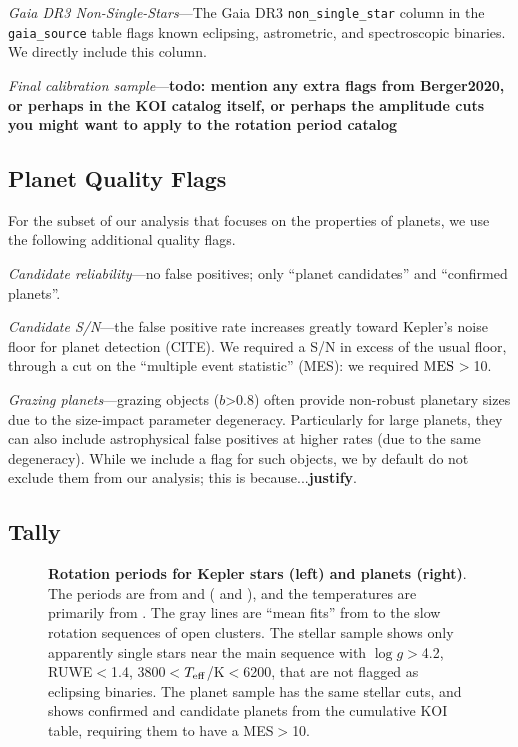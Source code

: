 \documentclass[11pt,twocolumn,tighten]{aastex63}
\begin{document}
{\it Gaia DR3 Non-Single-Stars}---The Gaia DR3
\texttt{non\_single\_star} column in the \texttt{gaia\_source} table
flags known eclipsing, astrometric, and spectroscopic binaries.  We
directly include this column.

{\it Final calibration sample}---{\bf todo: mention any extra flags
from Berger2020, or perhaps in the KOI catalog itself, or perhaps the
amplitude cuts you might want to apply to the rotation period catalog}


\subsection{Planet Quality Flags}
For the subset of our analysis that focuses on the properties of
planets, we use the following additional quality flags.

{\it Candidate reliability}---no false positives; only ``planet
candidates'' and ``confirmed planets''.

{\it Candidate S/N}---the false positive rate increases greatly toward
Kepler's noise floor for planet detection (CITE).  We required a S/N
in excess of the usual floor, through a cut on the ``multiple event
statistic'' (MES): we required ${\rm MES}$$>$10.

{\it Grazing planets}---grazing objects ($b$>0.8) often provide
non-robust planetary sizes due to the size-impact parameter
degeneracy.  Particularly for large planets, they can also include
astrophysical false positives at higher rates (due to the same
degeneracy).  While we include a flag for such objects, we by default
do not exclude them from our analysis; this is because...{\bf justify}.

\subsection{Tally}
\label{subsec:tally}

\begin{figure*}[!t]
	\begin{center}
	\end{center}
	\vspace{-0.5cm}
	\caption{
    {\bf Rotation periods for Kepler stars (left) and planets (right)}.
    The periods are from \citet{Santos_2019} and \citet{Santos_2021}
    ( and ), and the
    temperatures are primarily from \citet{Berger_2020a_catalog}.  The
    gray lines are ``mean fits'' from \citet{Bouma_2023} to the slow
    rotation sequences of open clusters.  The stellar sample shows
    only apparently single stars near the main sequence with $\log
    g$$>$4.2, RUWE$<$1.4, 3800$<$$T_{\rm eff}$/K$<$6200, that are not
    flagged as eclipsing binaries.  The planet sample has the same
    stellar cuts, and shows confirmed and candidate planets from the
    cumulative KOI table, requiring them to have a MES$>$10.
	}
	\label{fig:prot_vs_teff}
\end{figure*}
\end{document}
